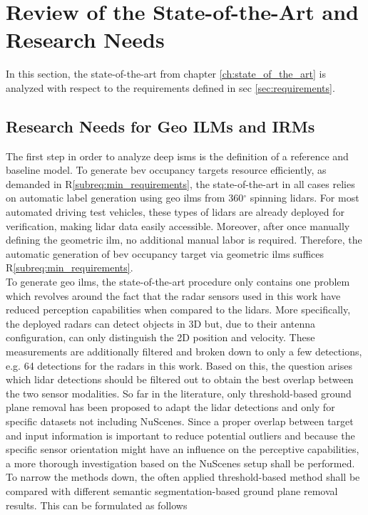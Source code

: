 \section{Review of the State-of-the-Art and Research Needs}
\label{sec:research_needs}
In this section, the state-of-the-art from chapter \ref{ch:state_of_the_art} is analyzed with respect to the requirements defined in sec \ref{sec:requirements}.

%
\subsection{Research Needs for Geo ILMs and IRMs}
\label{subsec:research_needs_for_geo_ilms_n_irms}
The first step in order to analyze deep \gls{ism}s is the definition of a reference and baseline model. To generate \gls{bev} occupancy targets resource efficiently, as demanded in R\ref{subreq:min_requirements}, the state-of-the-art in all cases relies on automatic label generation using geo \gls{ilm}s from 360$^\circ$ spinning lidars. For most automated driving test vehicles, these types of lidars are already deployed for verification, making lidar data easily accessible. Moreover, after once manually defining the geometric \gls{ilm}, no additional manual labor is required. Therefore, the automatic generation of \gls{bev} occupancy target via geometric \gls{ilm}s suffices R\ref{subreq:min_requirements}.
\\
To generate geo \gls{ilm}s, the state-of-the-art procedure only contains one problem which revolves around the fact that the radar sensors used in this work have reduced perception capabilities when compared to the lidars. More specifically, the deployed radars can detect objects in 3D but, due to their antenna configuration, can only distinguish the 2D position and velocity. These measurements are additionally filtered and broken down to only a few detections, e.g. 64 detections for the radars in this work. Based on this, the question arises which lidar detections should be filtered out to obtain the best overlap between the two sensor modalities. So far in the literature, only threshold-based ground plane removal has been proposed to adapt the lidar detections and only for specific datasets not including NuScenes. Since a proper overlap between target and input information is important to reduce potential outliers and because the specific sensor orientation might have an influence on the perceptive capabilities, a more thorough investigation based on the NuScenes setup shall be performed. To narrow the methods down, the often applied threshold-based method shall be compared with different semantic segmentation-based ground plane removal results. This can be formulated as follows

